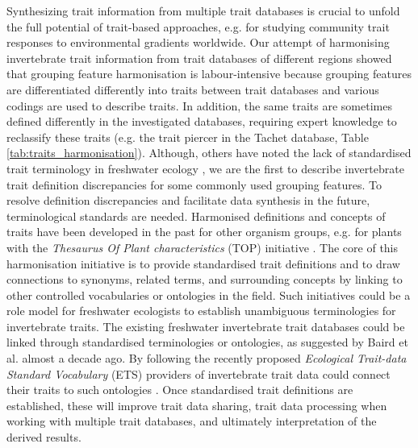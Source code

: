 \documentclass{article}
\begin{document}
Synthesizing trait information from multiple trait databases is crucial to unfold the full potential of trait-based approaches, e.g. for studying community trait responses to environmental gradients worldwide. Our attempt of harmonising invertebrate trait information from trait databases of different regions showed that grouping feature harmonisation is labour-intensive because grouping features are differentiated differently into traits between trait databases and various codings are used to describe traits. In addition, the same traits are sometimes defined differently in the investigated databases, requiring expert knowledge to reclassify these traits (e.g. the trait piercer in the Tachet database, Table \ref{tab:traits_harmonisation}). Although, others have noted the lack of standardised trait terminology in freshwater ecology \cite{baird_toward_2011, brink_traits-based_2011}, we are the first to describe invertebrate trait definition discrepancies for some commonly used grouping features.
To resolve definition discrepancies and facilitate data synthesis in the future,  terminological standards are needed. Harmonised definitions and concepts of traits have been developed in the past for other organism groups, e.g. for plants with the \textit{Thesaurus Of Plant characteristics} (TOP) initiative \cite{garnier_towards_2017}. The core of this harmonisation initiative is to provide standardised trait definitions and to draw connections to synonyms, related terms, and surrounding concepts by linking to other controlled vocabularies or ontologies in the field. Such initiatives could be a role model for freshwater ecologists to establish unambiguous terminologies for invertebrate traits. The existing freshwater invertebrate trait databases could be linked through standardised terminologies or ontologies, as suggested by Baird et al. \cite{baird_toward_2011} almost a decade ago. By following the recently proposed \textit{Ecological Trait-data Standard Vocabulary} (ETS) providers of invertebrate trait data could connect their traits to such ontologies \cite{schneider_towards_2019}. Once standardised trait definitions are established, these will improve trait data sharing, trait data processing when working with multiple trait databases, and ultimately interpretation of the derived results. %
\end{document}
